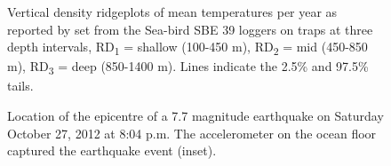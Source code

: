\documentclass[12pt]{article}\usepackage[]{graphicx}\usepackage[]{color}
\begin{document}
\begin{figure}[htb]

{\centering {} 

}

\caption{Vertical density ridgeplots of mean temperatures per year as reported by set from the Sea-bird SBE 39 loggers on traps at three depth intervals, RD\textsubscript{1} = shallow (100-450 m), RD\textsubscript{2} = mid (450-850 m), RD\textsubscript{3} = deep (850-1400 m). Lines indicate the 2.5\% and 97.5\% tails.}\label{fig:figure14}
\end{figure}
\clearpage

\clearpage


\begin{figure}[htb]

{\centering {} 

}

\caption{Location of the epicentre of a 7.7 magnitude earthquake on Saturday October 27, 2012 at 8:04 p.m. The accelerometer on the ocean floor captured the earthquake event (inset).}\label{fig:figure15}
\end{figure}
\clearpage
\end{document}
